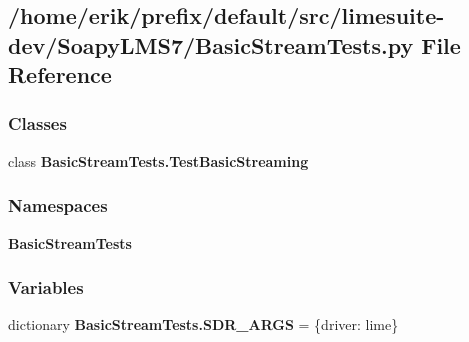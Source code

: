 \subsection{/home/erik/prefix/default/src/limesuite-\/dev/\+Soapy\+L\+M\+S7/\+Basic\+Stream\+Tests.py File Reference}
\label{BasicStreamTests_8py}
\subsubsection*{Classes}
\begin{DoxyCompactItemize}
\item 
class {\bf Basic\+Stream\+Tests.\+Test\+Basic\+Streaming}
\end{DoxyCompactItemize}
\subsubsection*{Namespaces}
\begin{DoxyCompactItemize}
\item 
 {\bf Basic\+Stream\+Tests}
\end{DoxyCompactItemize}
\subsubsection*{Variables}
\begin{DoxyCompactItemize}
\item 
dictionary {\bf Basic\+Stream\+Tests.\+S\+D\+R\+\_\+\+A\+R\+GS} = \{\textquotesingle{}driver\textquotesingle{}\+: \textquotesingle{}lime\textquotesingle{}\}
\end{DoxyCompactItemize}
